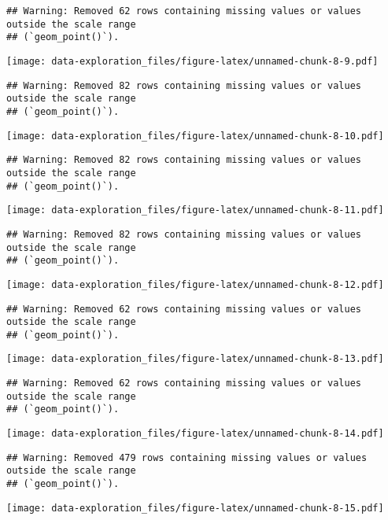 \documentclass[
]{article}
\begin{document}
\begin{verbatim}
## Warning: Removed 62 rows containing missing values or values outside the scale range
## (`geom_point()`).
\end{verbatim}

\texttt{[image: data-exploration\_files/figure-latex/unnamed-chunk-8-9.pdf]}

\begin{verbatim}
## Warning: Removed 82 rows containing missing values or values outside the scale range
## (`geom_point()`).
\end{verbatim}

\texttt{[image: data-exploration\_files/figure-latex/unnamed-chunk-8-10.pdf]}

\begin{verbatim}
## Warning: Removed 82 rows containing missing values or values outside the scale range
## (`geom_point()`).
\end{verbatim}

\texttt{[image: data-exploration\_files/figure-latex/unnamed-chunk-8-11.pdf]}

\begin{verbatim}
## Warning: Removed 82 rows containing missing values or values outside the scale range
## (`geom_point()`).
\end{verbatim}

\texttt{[image: data-exploration\_files/figure-latex/unnamed-chunk-8-12.pdf]}

\begin{verbatim}
## Warning: Removed 62 rows containing missing values or values outside the scale range
## (`geom_point()`).
\end{verbatim}

\texttt{[image: data-exploration\_files/figure-latex/unnamed-chunk-8-13.pdf]}

\begin{verbatim}
## Warning: Removed 62 rows containing missing values or values outside the scale range
## (`geom_point()`).
\end{verbatim}

\texttt{[image: data-exploration\_files/figure-latex/unnamed-chunk-8-14.pdf]}

\begin{verbatim}
## Warning: Removed 479 rows containing missing values or values outside the scale range
## (`geom_point()`).
\end{verbatim}

\texttt{[image: data-exploration\_files/figure-latex/unnamed-chunk-8-15.pdf]}
\end{document}
